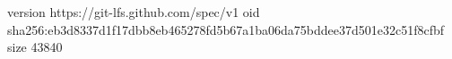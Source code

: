 version https://git-lfs.github.com/spec/v1
oid sha256:eb3d8337d1f17dbb8eb465278fd5b67a1ba06da75bddee37d501e32c51f8cfbf
size 43840
